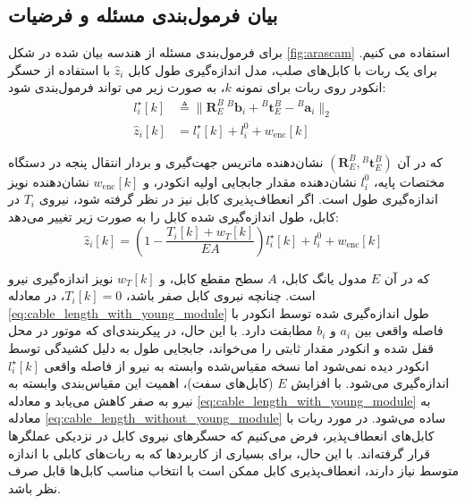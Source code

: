 \subsection{بیان فرمول‌بندی مسئله و فرضیات} \label{seq:formulation_rigid}
برای فرمول‌بندی مسئله از هندسه بیان شده در شکل 
\ref{fig:arascam}
استفاده می کنیم. برای یک ربات با کابل‌های صلب، مدل اندازه‌گیری طول کابل \( \hat{z}_i \) با استفاده از حسگر انکودر روی ربات برای نمونه $k$، به صورت زیر می تواند فرمول‌بندی ‌شود:
\begin{equation}\label{eq:cable_length_without_young_module}
	\begin{split}
		l^\star_i [k] &\triangleq \| \boldsymbol{R}^B_E ~ {}^B\!\boldsymbol{b}_i + {}^B\!\boldsymbol{t}_E^B - {}^B\!\boldsymbol{a}_i \|_2 \\
		\hat{z}_i [k] &= l^\star_i [k] + l_{i}^0 + w_{\text{enc}} [k]
	\end{split}
\end{equation}


که در آن
\( (\boldsymbol{R}^B_E, {}^B\!\boldsymbol{t}_E^B) \)
 نشان‌دهنده ماتریس جهت‌گیری و بردار انتقال پنجه در دستگاه مختصات پایه،
\(l_{i}^0  \)
نشان‌دهنده مقدار جابجایی اولیه انکودر، و 
\( w_{\text{enc}} [k] \)
 نشان‌دهنده نویز اندازه‌گیری طول است. اگر انعطاف‌پذیری کابل نیز در نظر گرفته شود، نیروی
\( T_i \)
 در کابل، طول اندازه‌گیری شده کابل را به صورت زیر تغییر می‌دهد:
\begin{equation} \label{eq:cable_length_with_young_module}
	\hat{z}_i [k] = \left(1 - \frac{T_i [k] + w_T [k]}{EA} \right) l^\star_i [k] + l_{i}^0 + w_{\text{enc}} [k]
\end{equation}


که در آن \( E \) مدول یانگ کابل، \( A \) سطح مقطع کابل، و \( w_T [k] \) نویز اندازه‌گیری نیرو است. چنانچه نیروی کابل صفر باشد،
\( T_i [k] = 0 \)، 
در معادله 
\ref{eq:cable_length_with_young_module}
 طول اندازه‌گیری شده توسط انکودر با فاصله واقعی بین \( a_i \) و \( b_i \) مطابقت دارد. با این حال، در پیکربندی‌ای که موتور در محل قفل شده و انکودر مقدار ثابتی را می‌خواند، جابجایی طول به دلیل کشیدگی توسط انکودر دیده نمی‌شود اما نسخه مقیاس‌شده وابسته به نیرو از فاصله واقعی \( l^\star_i [k] \) اندازه‌گیری می‌شود. با افزایش \( E \) (کابل‌های سفت)، اهمیت این مقیاس‌بندی وابسته به نیرو به صفر کاهش می‌یابد و معادله 
\ref{eq:cable_length_with_young_module}
به معادله
\ref{eq:cable_length_without_young_module}
 ساده می‌شود. در مورد ربات‌ با کابل‌های انعطاف‌پذیر، فرض می‌کنیم که حسگرهای نیروی کابل در نزدیکی عملگرها قرار گرفته‌اند. با این حال، برای بسیاری از کاربردها که به ربات‌های کابلی با اندازه متوسط نیاز دارند، انعطاف‌پذیری کابل ممکن است با انتخاب مناسب کابل‌ها قابل صرف نظر باشد.


